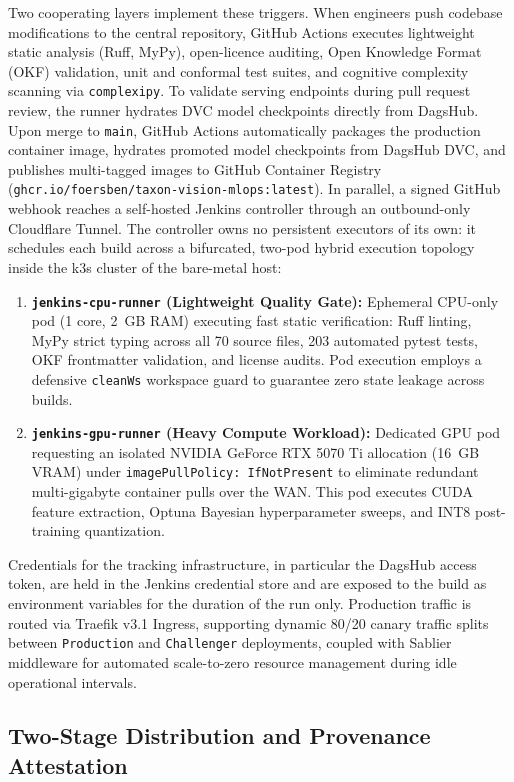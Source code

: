 Two cooperating layers implement these triggers. When engineers push codebase modifications to the central repository, GitHub Actions executes lightweight static analysis (Ruff, MyPy), open-licence auditing, Open Knowledge Format (OKF) validation, unit and conformal test suites, and cognitive complexity scanning via \texttt{complexipy}. To validate serving endpoints during pull request review, the runner hydrates DVC model checkpoints directly from DagsHub. Upon merge to \texttt{main}, GitHub Actions automatically packages the production container image, hydrates promoted model checkpoints from DagsHub DVC, and publishes multi-tagged images to GitHub Container Registry (\texttt{ghcr.io/foersben/taxon-vision-mlops:latest}). In parallel, a signed GitHub webhook reaches a self-hosted Jenkins controller through an outbound-only Cloudflare Tunnel. The controller owns no persistent executors of its own: it schedules each build across a bifurcated, two-pod hybrid execution topology inside the k3s cluster of the bare-metal host:
\begin{enumerate}
    \item \textbf{\texttt{jenkins-cpu-runner} (Lightweight Quality Gate):} Ephemeral CPU-only pod (1 core, 2~GB RAM) executing fast static verification: Ruff linting, MyPy strict typing across all 70 source files, 203 automated pytest tests, OKF frontmatter validation, and license audits. Pod execution employs a defensive \texttt{cleanWs} workspace guard to guarantee zero state leakage across builds.
    \item \textbf{\texttt{jenkins-gpu-runner} (Heavy Compute Workload):} Dedicated GPU pod requesting an isolated NVIDIA GeForce RTX 5070 Ti allocation (16~GB VRAM) under \texttt{imagePullPolicy: IfNotPresent} to eliminate redundant multi-gigabyte container pulls over the WAN. This pod executes CUDA feature extraction, Optuna Bayesian hyperparameter sweeps, and INT8 post-training quantization.
\end{enumerate}
Credentials for the tracking infrastructure, in particular the DagsHub access token, are held in the Jenkins credential store and are exposed to the build as environment variables for the duration of the run only. Production traffic is routed via Traefik v3.1 Ingress, supporting dynamic 80/20 canary traffic splits between \texttt{Production} and \texttt{Challenger} deployments, coupled with Sablier middleware for automated scale-to-zero resource management during idle operational intervals.

\subsection{Two-Stage Distribution and Provenance Attestation}
\label{subsec:release_distribution}


